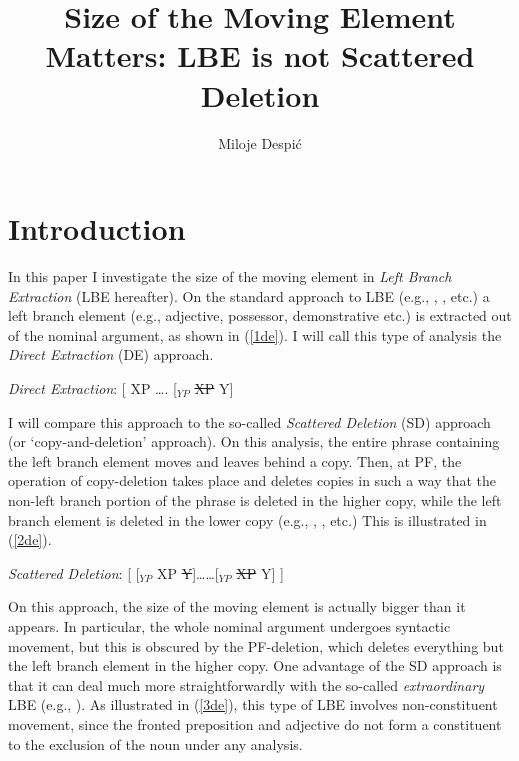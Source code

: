 \documentclass[
    output=paper,
    colorlinks,
    citecolor=brown,
]{langscibook}
\author{Miloje Despić \affiliation{Cornell University}\orcid{}}
\title{Size of the Moving Element Matters: LBE is not Scattered Deletion }
\begin{document}
\maketitle

\section{Introduction}
In this paper I investigate the size of the moving element in \textit{Left Branch Extraction} (LBE hereafter). On the standard approach to LBE (e.g.,
\citeauthor{Riemsdijk1978}, \citeauthor{Corver1990}, \citeauthor{Boskovic2005} etc.) a left branch element (e.g., adjective, possessor, demonstrative etc.) is extracted out of the nominal argument, as shown in (\ref{1de}). I will call this type of analysis the \textit{Direct Extraction} (DE) approach.

\begin{exe}
\ex \label{1de}
\textit{Direct Extraction}: [  XP …. [$_{YP}$  \sout{XP}  Y]  
\end{exe}

I will compare this approach to the so-called \textit{Scattered Deletion} (SD) approach (or ‘copy-and-deletion’ approach). On this analysis, the entire phrase containing the left branch element moves and leaves behind a copy. Then, at PF, the operation of copy-deletion takes place and deletes copies in such a way that the non-left branch portion of the phrase is deleted in the higher copy, while the left branch element is deleted in the lower copy (e.g., \citealt{FanselowCavar2002}, \citealt{Pereltsvaig2008}, \citealt{BondarenkoColin2018} etc.) This is illustrated in (\ref{2de}). 

\begin{exe}
\ex \label{2de}
\textit{Scattered Deletion}:  [  [$_{YP}$  XP  \sout{Y}]……[$_{YP}$ \sout{XP}  Y] ]  
\end{exe}

On this approach, the size of the moving element is actually bigger than it appears. In particular, the whole nominal argument undergoes syntactic movement, but this is obscured by the PF-deletion, which deletes everything but the left branch element in the higher copy. One advantage of the SD approach is that it can deal much more straightforwardly with the so-called \textit{extraordinary} LBE (e.g., \citealt{Boskovic2005}). As illustrated in (\ref{3de}), this type of LBE involves non-constituent movement, since the fronted preposition and adjective do not form a constituent to the exclusion of the noun under any analysis. 
\end{document}
